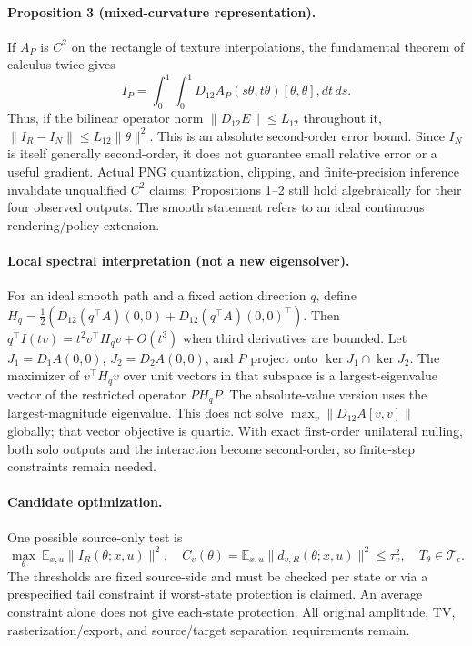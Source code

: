 \paragraph{Proposition 3 (mixed-curvature representation).}
If $A_P$ is $C^2$ on the rectangle of texture interpolations, the fundamental
theorem of calculus twice gives
\[
 I_P=\int_0^1\!\int_0^1D_{12} A_P(s\theta,t\theta)
                    [\theta,\theta],dt\,ds.
\]
Thus, if the bilinear operator norm $\|D_{12}E\|\le L_{12}$ throughout it,
$\|I_R-I_N\|\le L_{12}\|\theta\|^2$.
This is an absolute second-order error bound. Since $I_N$ is itself generally
second-order, it does not guarantee small relative error or a useful gradient.
Actual PNG quantization, clipping, and finite-precision inference invalidate
unqualified $C^2$ claims; Propositions 1--2 still hold algebraically for their
four observed outputs. The smooth statement refers to an ideal continuous
rendering/policy extension.

\paragraph{Local spectral interpretation (not a new eigensolver).}
For an ideal smooth path and a fixed action direction $q$, define
$H_q=\tfrac12(D_{12}(q^\top A)(0,0)+D_{12}(q^\top A)(0,0)^\top)$.
Then $q^\top I(t v)=t^2v^\top H_qv+O(t^3)$ when third derivatives are bounded.
Let $J_1=D_1A(0,0)$, $J_2=D_2A(0,0)$, and $P$ project onto
$\ker J_1\cap\ker J_2$. The maximizer of $v^\top H_qv$ over unit vectors in
that subspace is a largest-eigenvalue vector of the restricted operator
$P H_q P$. The absolute-value version uses the largest-magnitude eigenvalue.
This does not solve $\max_v\|D_{12}A[v,v]\|$ globally; that vector objective
is quartic. With exact first-order unilateral nulling, both solo outputs and
the interaction become second-order, so finite-step constraints remain needed.

\paragraph{Candidate optimization.}
One possible source-only test is
\[
 \max_\theta\ \mathbb E_{x,u}\|I_R(\theta;x,u)\|^2,
 \quad C_v(\theta)=\mathbb E_{x,u}\|d_{v,R}(\theta;x,u)\|^2\le\tau_v^2,
 \quad T_\theta\in\mathcal T_\epsilon.
\]
The thresholds are fixed source-side and must be checked per state or via a
prespecified tail constraint if worst-state protection is claimed. An average
constraint alone does not give each-state protection. All original amplitude,
TV, rasterization/export, and source/target separation requirements remain.

